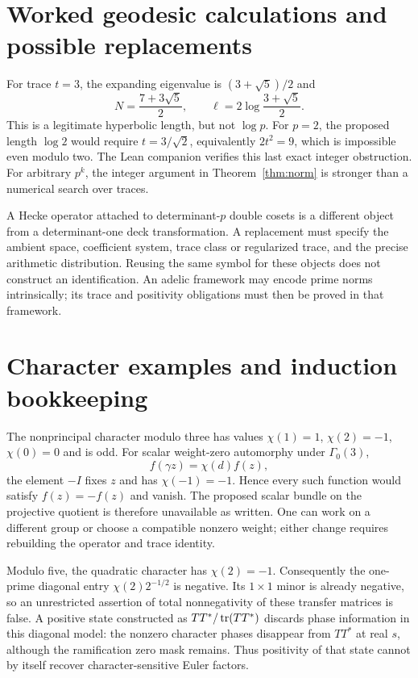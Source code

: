 \appendix
\section{Worked geodesic calculations and possible replacements}
For trace $t=3$, the expanding eigenvalue is $(3+\sqrt5)/2$ and
\[
 N=\frac{7+3\sqrt5}{2},\qquad
 \ell=2\log\frac{3+\sqrt5}{2}.
\]
This is a legitimate hyperbolic length, but not $\log p$.
For $p=2$, the proposed length $\log2$ would require
$t=3/\sqrt2$, equivalently $2t^2=9$, which is impossible even modulo two.
The Lean companion verifies this last exact integer obstruction.
For arbitrary $p^k$, the integer argument in Theorem~\ref{thm:norm}
is stronger than a numerical search over traces.

A Hecke operator attached to determinant-$p$ double cosets is a different
object from a determinant-one deck transformation. A replacement must
specify the ambient space, coefficient system, trace class or regularized
trace, and the precise arithmetic distribution. Reusing the same symbol
for these objects does not construct an identification.
An adelic framework may encode prime norms intrinsically; its trace and
positivity obligations must then be proved in that framework.

\section{Character examples and induction bookkeeping}
The nonprincipal character modulo three has values
$\chi(1)=1$, $\chi(2)=-1$, $\chi(0)=0$ and is odd.
For scalar weight-zero automorphy under $\Gamma_0(3)$,
\[
 f(\gamma z)=\chi(d)f(z),
\]
the element $-I$ fixes $z$ and has $\chi(-1)=-1$. Hence every such
function would satisfy $f(z)=-f(z)$ and vanish. The proposed scalar bundle
on the projective quotient is therefore unavailable as written. One can
work on a different group or choose a compatible nonzero weight; either
change requires rebuilding the operator and trace identity.

Modulo five, the quadratic character has $\chi(2)=-1$.
Consequently the one-prime diagonal entry $\chi(2)2^{-1/2}$ is negative.
Its $1\times1$ minor is already negative, so an unrestricted assertion of
total nonnegativity of these transfer matrices is false. A positive state
constructed as $TT^*/\operatorname{tr}(TT^*)$ discards phase information in this diagonal
model: the nonzero character phases disappear from $TT^*$ at real $s$, although the ramification zero mask remains. Thus positivity
of that state cannot by itself recover character-sensitive Euler factors.

